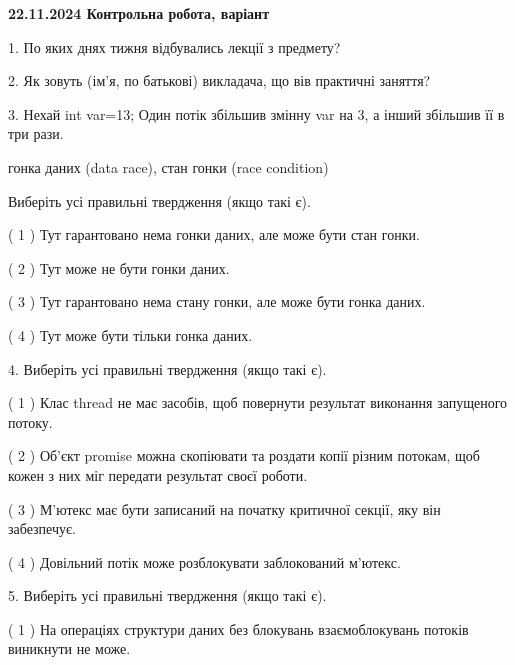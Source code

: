 \documentclass[12pt, ukrainian]{article}
\begin{document}
\vspace{4mm}
\newpage
\begin {large}

\textbf{22.11.2024 Контрольна робота, варіант  }\par


{
1. По яких днях тижня відбувались лекції з предмету?



\vspace{5mm}
2. Як зовуть (ім'я, по батькові) викладача, що вів практичні заняття?



\vspace{5mm}
3. Нехай int var=13; Один потік збільшив змінну var на 3, а інший збільшив її в три рази.

гонка даних (data race), стан гонки (race condition)

Виберіть усі правильні твердження (якщо такі є).\par
\vspace{2mm}
( 1 ) Тут гарантовано нема гонки даних, але може бути стан гонки.%

( 2 ) Тут може не бути гонки даних.%

( 3 ) Тут гарантовано нема стану гонки, але може бути гонка даних.%

( 4 ) Тут може бути тільки гонка даних.%


\vspace{5mm}
4. Виберіть усі правильні твердження (якщо такі є).\par
\vspace{2mm}

( 1 ) Клас thread не має засобів, щоб повернути результат виконання запущеного потоку.%

( 2 ) Об’єкт promise можна скопіювати та роздати копії різним потокам, щоб кожен з них міг передати результат своєї роботи.%

( 3 ) М’ютекс має бути записаний на початку критичної секції, яку він забезпечує.%

( 4 ) Довільний потік може розблокувати заблокований м’ютекс.%


\vspace{5mm}
5. Виберіть усі правильні твердження (якщо такі є).\par
\vspace{2mm}

( 1 ) На операціях структури даних без блокувань взаємоблокувань потоків виникнути не може.%

}
\end{large}
\end{document}
